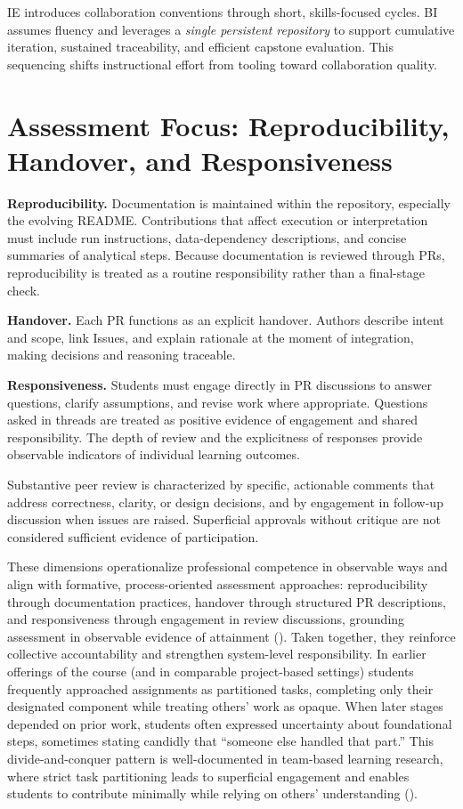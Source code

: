 IE introduces collaboration conventions through short, skills-focused cycles. BI assumes fluency and leverages a \emph{single persistent repository} to support cumulative iteration, sustained traceability, and efficient capstone evaluation. This sequencing shifts instructional effort from tooling toward collaboration quality.

\section{Assessment Focus: Reproducibility, Handover, and Responsiveness}

\textbf{Reproducibility.} Documentation is maintained within the repository, especially the evolving README. Contributions that affect execution or interpretation must include run instructions, data-dependency descriptions, and concise summaries of analytical steps. Because documentation is reviewed through PRs, reproducibility is treated as a routine responsibility rather than a final-stage check.

\textbf{Handover.} Each PR functions as an explicit handover. Authors describe intent and scope, link Issues, and explain rationale at the moment of integration, making decisions and reasoning traceable.

\textbf{Responsiveness.} Students must engage directly in PR discussions to answer questions, clarify assumptions, and revise work where appropriate. Questions asked in threads are treated as positive evidence of engagement and shared responsibility. 
The depth of review and the explicitness of responses provide observable indicators of individual learning outcomes.

Substantive peer review is characterized by specific, actionable comments that address correctness, clarity, or design decisions, and by engagement in follow-up discussion when issues are raised. Superficial approvals without critique are not considered sufficient evidence of participation.

These dimensions operationalize professional competence in observable ways and align with formative, process-oriented assessment approaches: reproducibility through documentation practices, handover through structured PR descriptions, and responsiveness through engagement in review discussions, grounding assessment in observable evidence of attainment (\cite{biggs_constructive}). 
Taken together, they reinforce collective accountability and strengthen system-level responsibility. In earlier offerings of the course (and in comparable project-based settings) students frequently approached assignments as partitioned tasks, completing only their designated component while treating others' work as opaque. When later stages depended on prior work, students often expressed uncertainty about foundational steps, sometimes stating candidly that ``someone else handled that part.'' This divide-and-conquer pattern is well-documented in team-based learning research, where strict task partitioning leads to superficial engagement and enables students to contribute minimally while relying on others' understanding (\cite{borjesson_freeriding_2006}).

